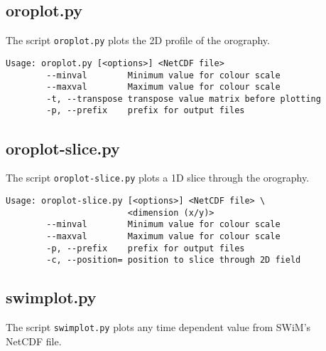 \documentclass[11pt,a4paper,openright,twoside]{book}
\newcommand{\thecodenospace}{SWiM}
\begin{document}
\subsection{oroplot.py}
The script \texttt{oroplot.py} plots the 2D profile of the orography.

\begin{verbatim}
Usage: oroplot.py [<options>] <NetCDF file>
        --minval        Minimum value for colour scale
        --maxval        Maximum value for colour scale
        -t, --transpose transpose value matrix before plotting
        -p, --prefix    prefix for output files
\end{verbatim}

\subsection{oroplot-slice.py}
The script \texttt{oroplot-slice.py} plots a 1D slice through the orography.

\begin{verbatim}
Usage: oroplot-slice.py [<options>] <NetCDF file> \
                        <dimension (x/y)>
        --minval        Minimum value for colour scale
        --maxval        Maximum value for colour scale
        -p, --prefix    prefix for output files
        -c, --position= position to slice through 2D field
\end{verbatim}

\newpage
\subsection{swimplot.py}
The script \texttt{swimplot.py} plots any time dependent value from \thecodenospace's\\
NetCDF file.
\end{document}

